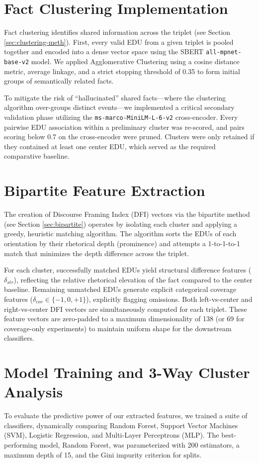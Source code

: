 \documentclass[11pt]{article}
\begin{document}
\section{Fact Clustering Implementation}
\label{app:clustering}
Fact clustering identifies shared information across the triplet (see Section \ref{sec:clustering-meth}). First, every valid EDU from a given triplet is pooled together and encoded into a dense vector space using the SBERT \texttt{all-mpnet-base-v2} model. We applied Agglomerative Clustering using a cosine distance metric, average linkage, and a strict stopping threshold of 0.35 to form initial groups of semantically related facts. 

To mitigate the risk of ``hallucinated'' shared facts---where the clustering algorithm over-groups distinct events---we implemented a critical secondary validation phase utilizing the \texttt{ms-marco-MiniLM-L-6-v2} cross-encoder. Every pairwise EDU association within a preliminary cluster was re-scored, and pairs scoring below 0.7 on the cross-encoder were pruned. Clusters were only retained if they contained at least one center EDU, which served as the required comparative baseline.

\section{Bipartite Feature Extraction}
\label{app:bipartite}
The creation of Discourse Framing Index (DFI) vectors via the bipartite method (see Section \ref{sec:bipartite}) operates by isolating each cluster and applying a greedy, heuristic matching algorithm. The algorithm sorts the EDUs of each orientation by their rhetorical depth (prominence) and attempts a 1-to-1-to-1 match that minimizes the depth difference across the triplet.

For each cluster, successfully matched EDUs yield structural difference features ($\delta_{str}$), reflecting the relative rhetorical elevation of the fact compared to the center baseline. Remaining unmatched EDUs generate explicit categorical coverage features ($\delta_{cov} \in \{-1, 0, +1\}$), explicitly flagging omissions. Both left-vs-center and right-vs-center DFI vectors are simultaneously computed for each triplet. These feature vectors are zero-padded to a maximum dimensionality of 138 (or 69 for coverage-only experiments) to maintain uniform shape for the downstream classifiers.

\section{Model Training and 3-Way Cluster Analysis}
\label{app:training}
To evaluate the predictive power of our extracted features, we trained a suite of classifiers, dynamically comparing Random Forest, Support Vector Machines (SVM), Logistic Regression, and Multi-Layer Perceptrons (MLP). The best-performing model, Random Forest, was parameterized with 200 estimators, a maximum depth of 15, and the Gini impurity criterion for splits. 
\end{document}

